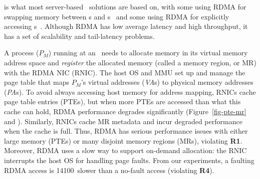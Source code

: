  is what most server-based \md\ solutions are based on, with some using RDMA for swapping memory between \CN{}s and \MN{}s~\cite{InfiniSwap,FastSwap,Semeru} and some using RDMA for explicitly accessing \MN{}s~\cite{AIFM,zombieland,FaRM}.
Although RDMA has low average latency and high throughput, it has a set of scalability and tail-latency problems.

A process ($P_M$) running at an \MN\ needs to allocate memory in its virtual memory address space 
and {\em register} the allocated memory (called a memory region, or MR) with the RDMA NIC (RNIC).
The host OS and MMU set up and manage the page table that maps $P_M$'s virtual addresses ({\em VA}s) to physical memory addresses ({\em PA}s).
To avoid always accessing host memory for address mapping, RNICs cache page table entries (PTEs),
but when more PTEs are accessed than what this cache can hold, RDMA performance degrades significantly (Figure~\ref{fig-pte-mr} and \cite{FaRM,Tsai17-SOSP}).
Similarly, RNICs cache MR metadata and incur degraded performance when the cache is full. 
Thus, RDMA has serious performance issues with either large memory (PTEs) or many disjoint memory regions (MRs), violating \textbf{R1}.
Moreover, RDMA uses a slow way to support on-demand allocation: the RNIC interrupts the host OS for handling page faults.
From our experiments, a faulting RDMA access is 14100\x\ slower than a no-fault access (violating \textbf{R4}).

